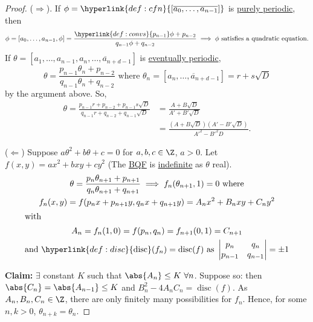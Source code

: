 \documentclass{article}
\DeclareMathOperator{\disc}{disc}
\begin{document}
\begin{proof}
    ($\Rightarrow$). If $\phi = \hyperlink{def:cfn}{[\overline{a_0, \dotsc, a_{n-1}}]}$ is \hyperlink{def:period}{purely periodic}, then
    \begin{equation*}
        \phi = [a_0, \dotsc, a_{n-1}, \phi] = \frac{\hyperlink{def:convs}{p_{n-1}} \phi + p_{n-2}}{q_{n-1} \phi + q_{n-2}} \implies \phi \text{ satisfies a quadratic equation}.
    \end{equation*}
    If $\theta = [a_1, \dotsc, a_{n-1}, \overline{a_n, \dotsc, a_{n+d-1}}]$ is \hyperlink{def:period}{eventually periodic},
    \begin{equation*}
        \theta = \frac{p_{n-1} \theta_n + p_{n-2}}{q_{n-1} \theta_n + q_{n-2}} \text{ where } \theta_n = [\overline{a_n, \dotsc, a_{n+d-1}}] = r + s \sqrt{D}
    \end{equation*}
    by the argument above.
    So,
    \begin{align*}
        \theta = \frac{p_{n-1} r + p_{n-2} + p_{n-1} s \sqrt{D}}{q_{n-1} r + q_{n-2} + q_{n-1} \sqrt{D}} &= \frac{A + B \sqrt{D}}{A' + B' \sqrt{D}} \\
                                                                                                         &= \frac{(A + B \sqrt{D})(A' - B' \sqrt{D})}{A'^2 - B'^2 D}.
    \end{align*}

    ($\Leftarrow$) Suppose $a \theta^2 + b \theta + c= 0$ for $a, b, c \in \Z$, $a > 0$.
    Let $f(x, y) = a x^2 + b x y + c y^2$ (The \hyperlink{def:bqf}{BQF} is \hyperlink{def:definite}{indefinite} as $\theta$ real).
    \begin{gather*}
        \theta = \frac{p_n \theta_{n+1} + p_{n+1}}{q_n \theta_{n+1} + q_{n+1}} \implies f_n(\theta_{n+1}, 1) = 0 \text{ where} \\
        f_n(x, y) = f(p_n x + p_{n+1} y, q_n x + q_{n+1} y) = A_n x^2 + B_n x y + C_n y^2 \\
        \shortintertext{with}
        A_n = f_n(1, 0) = f(p_n, q_n) = f_{n+1}(0, 1) = C_{n+1} \\
        \text{and } \hyperlink{def:disc}{\disc}(f_n) = \disc(f) \text{ as } \begin{vmatrix} p_n & q_n \\ p_{n-1} & q_{n-1} \end{vmatrix} = \pm 1
    \end{gather*}

    \textbf{Claim:} $\exists$ constant $K$ such that $\abs{A_n} \leq K \ \forall n$.
    Suppose so: then $\abs{C_n} = \abs{A_{n-1}} \leq K$ and $B_n^2 - 4 A_n C_n = \disc(f)$.
    As $A_n, B_n, C_n \in \Z$, there are only finitely many possibilities for $f_n$. Hence, for some $n, k > 0$, $\theta_{n+k} = \theta_n$.


\end{proof}
\end{document}
